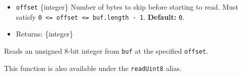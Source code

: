 \begin{itemize}
\tightlist
\item
  \texttt{offset} \{integer\} Number of bytes to skip before starting to
  read. Must satisfy
  \texttt{0\ \textless{}=\ offset\ \textless{}=\ buf.length\ -\ 1}.
  \textbf{Default:} \texttt{0}.
\item
  Returns: \{integer\}
\end{itemize}

Reads an unsigned 8-bit integer from \texttt{buf} at the specified
\texttt{offset}.

This function is also available under the \texttt{readUint8} alias.

\begin{Shaded}
\begin{Highlighting}[]
\NormalTok{ \{ }\NormalTok{ \} } \OperatorTok{;}

\OperatorTok{=} \NormalTok{([}\OperatorTok{,} \OperatorTok{{-}}\NormalTok{])}\OperatorTok{;}

\NormalTok{(}\NormalTok{))}\OperatorTok{;}
\NormalTok{(}\NormalTok{))}\OperatorTok{;}
\NormalTok{(}\NormalTok{))}\OperatorTok{;}
\end{Highlighting}
\end{Shaded}

\begin{Shaded}
\begin{Highlighting}[]
\NormalTok{ \{ }\NormalTok{ \} }\OperatorTok{=} \NormalTok{(}\NormalTok{)}\OperatorTok{;}

\OperatorTok{=} \NormalTok{([}\OperatorTok{,} \OperatorTok{{-}}\NormalTok{])}\OperatorTok{;}

\NormalTok{(}\NormalTok{))}\OperatorTok{;}
\NormalTok{(}\NormalTok{))}\OperatorTok{;}
\NormalTok{(}\NormalTok{))}\OperatorTok{;}
\end{Highlighting}
\end{Shaded}

